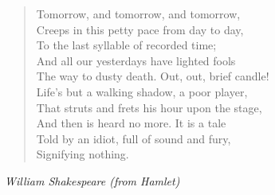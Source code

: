 \documentclass[10pt]{memoir}
\newcommand{\poemauthor}[1]{{\small\itshape #1}\par\medskip}
\begin{document}
\begin{verse}
Tomorrow, and tomorrow, and tomorrow,\\
Creeps in this petty pace from day to day,\\
To the last syllable of recorded time;\\
And all our yesterdays have lighted fools\\
The way to dusty death. Out, out, brief candle!\\
Life's but a walking shadow, a poor player,\\
That struts and frets his hour upon the stage,\\
And then is heard no more. It is a tale\\
Told by an idiot, full of sound and fury,\\
Signifying nothing.
\end{verse}

\clearpage

\poemauthor{William Shakespeare (from \textit{Hamlet})}
\end{document}
